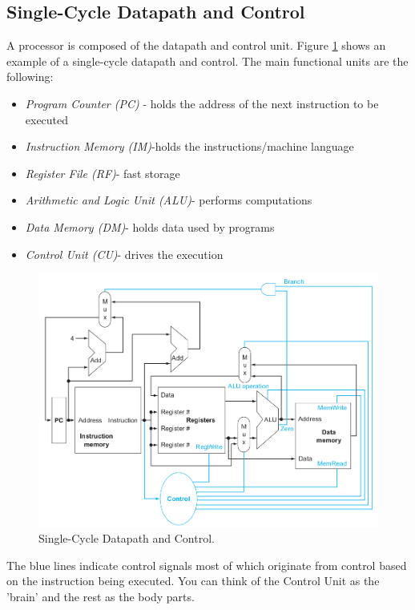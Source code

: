 \documentclass[a4paper, 11pt,oneside]{article}
\begin{document}
\subsection{Single-Cycle Datapath and Control}
A processor is composed of the datapath and control unit. Figure \ref{fig:datapath} shows an example of a 
single-cycle datapath and control. The main functional units are the following:
\begin{itemize}
	\item{\textit{Program Counter (PC)} - holds the address of the next instruction to be executed}
	\item{\textit{Instruction Memory (IM)}-holds the instructions/machine language}
	\item{\textit{Register File (RF)}- fast storage}
	\item{\textit{Arithmetic and Logic Unit (ALU)}- performs computations}
	\item{\textit{Data Memory (DM)}- holds data used by programs}
	\item{\textit{Control Unit (CU)}- drives the execution }
\end{itemize}

\begin{figure}[H]
	\includegraphics[width=\linewidth]{single-cycle-dp-control.png}
	\caption{Single-Cycle Datapath and Control.}
	\label{fig:datapath}
\end{figure}

The blue lines indicate control signals most of which originate from control based on the instruction being executed. You can think of the Control Unit as the 'brain' and the rest as the body parts.
\end{document}
